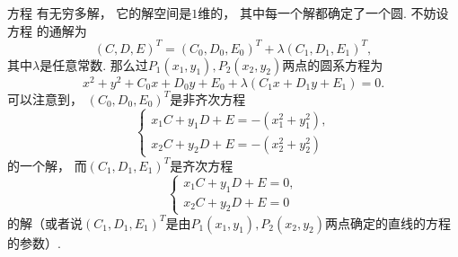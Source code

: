 方程  有无穷多解，
它的解空间是\(1\)维的，
其中每一个解都确定了一个圆.
不妨设方程  的通解为\begin{equation*}
	(C,D,E)^T
	= (C_0,D_0,E_0)^T
	+ \lambda (C_1,D_1,E_1)^T,
\end{equation*}
其中\(\lambda\)是任意常数.
那么过\(P_1(x_1,y_1),P_2(x_2,y_2)\)两点的圆系方程为\begin{equation*}
	x^2 + y^2 + C_0 x + D_0 y + E_0 + \lambda (C_1 x + D_1 y + E_1) = 0.
\end{equation*}
可以注意到，
\((C_0,D_0,E_0)^T\)是非齐次方程\begin{equation*}
	\begin{cases}
		x_1 C + y_1 D + E = -(x_1^2 + y_1^2), \\
		x_2 C + y_2 D + E = -(x_2^2 + y_2^2)
	\end{cases}
\end{equation*}
的一个解，
而\((C_1,D_1,E_1)^T\)是齐次方程\begin{equation*}
	\begin{cases}
		x_1 C + y_1 D + E = 0, \\
		x_2 C + y_2 D + E = 0
	\end{cases}
\end{equation*}
的解（或者说\((C_1,D_1,E_1)^T\)是由\(P_1(x_1,y_1),P_2(x_2,y_2)\)两点确定的直线的方程的参数）.
